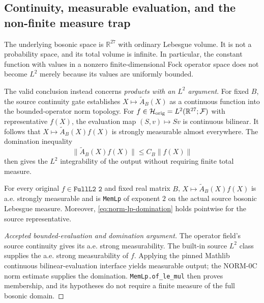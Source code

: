 \subsection{Continuity, measurable evaluation, and the non-finite measure trap}
The underlying bosonic space is $\mathbb R^{27}$ with ordinary
Lebesgue volume. It is not a probability space, and its total volume
is infinite. In particular, the constant function with values in a
nonzero finite-dimensional Fock operator space does not become
$L^2$ merely because its values are uniformly bounded.

The valid conclusion instead concerns \emph{products with an $L^2$
argument}. For fixed $B$, the source continuity gate establishes
$X\mapsto\widetilde A_B(X)$ as a continuous function into the
bounded-operator norm topology. For $f\in\mathcal H_{\mathrm{orig}}=L^2(\mathbb R^{27};\mathcal F)$
with representative $f(X)$, the evaluation map
$(S,v)\mapsto Sv$ is continuous bilinear. It follows that
$X\mapsto\widetilde A_B(X)f(X)$ is strongly measurable almost
everywhere. The domination inequality
\begin{equation}\label{eq:norm-lp-domination}
  \|\widetilde A_B(X)f(X)\|\le C_B\|f(X)\|
\end{equation}
then gives the $L^2$ integrability of the output without requiring
finite total measure.

\begin{theorem}\label{thm:norm-memlp}
For every original $f\in\texttt{FullL2 2}$ and fixed real matrix $B$,
$X\mapsto\widetilde A_B(X)f(X)$ is a.e. strongly measurable and is
\texttt{MemLp} of exponent $2$ on the actual source bosonic Lebesgue
measure. Moreover, \eqref{eq:norm-lp-domination} holds pointwise for
the source representative.
\end{theorem}
\begin{proof}[Accepted bounded-evaluation and domination argument]
The operator field's source continuity gives its a.e. strong
measurability. The built-in source $L^2$ class supplies the a.e.
strong measurability of $f$. Applying the pinned Mathlib continuous
bilinear-evaluation interface yields measurable output; the NORM-0C
norm estimate supplies the domination. \texttt{MemLp.of\_le\_mul}
then proves membership, and its hypotheses do not require a finite
measure of the full bosonic domain.
\end{proof}

